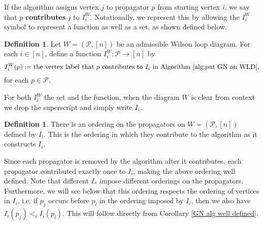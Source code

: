 \documentclass[11pt]{article}
\newcommand{\note}{\todo[color=green!40]}
\newcommand{\cP}{\mathcal{P}}
\theoremstyle{remark}
\theoremstyle{definition}
\newtheorem{dfn}[thm]{Definition}
\begin{document}
If the algorithm assigns vertex $j$ to propagator $p$ from starting vertex $i$, we say that $p$ \textbf{contributes} $j$ to $I_i^W$. Notationally, we represent this by allowing the $I_i^W$ symbol to represent a function as well as a set, as shown defined below.
\begin{dfn}\label{def I_i as a function}
Let $W = (\cP, [n])$ be an admissible Wilson loop diagram. For each $i \in [n]$, define a function $I_i^W : \cP \longrightarrow [n]$ by
\[I_i^W(p) := \text{the vertex label that $p$ contributes to $I_i$ in Algorithm~\ref{alg:put GN on WLD},}\]
for each $p \in \cP$. 
\end{dfn}

For both $I_i^W$ the set and the function, when the diagram $W$ is clear from context we drop the superscript and simply write $I_i$.

  
\begin{dfn} \label{proporderingdfn}
  There is an ordering on the propagators on $W = (\cP, [n])$ defined by $I_i$. This is the ordering in which they contribute to the algorithm as it constructs $I_i$.
\end{dfn}

Since each propagator is removed by the algorithm after it contributes, each propagator contributed exactly once to $I_i$, making the above ordering well defined.
Note that different $I_*$ impose different orderings on the propagators. Furthermore, we will see below that this ordering respects the ordering of vertices in $I_i$, i.e. if $p_j$ occurs before $p_l$ in the ordering imposed by $I_i$, then we also have $I_i(p_j) <_i I_i(p_l)$. This will follow directly from Corollary \ref{GN alg well defined}.
\end{document}

